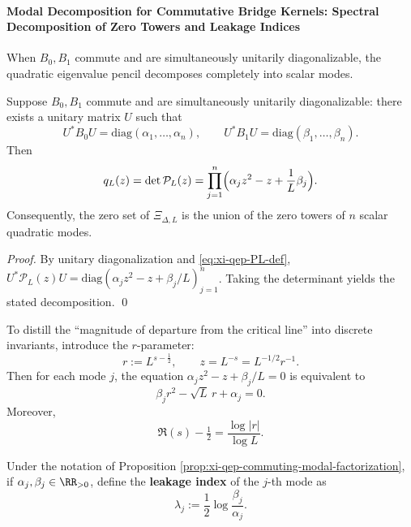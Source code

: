 \paragraph{Modal Decomposition for Commutative Bridge Kernels: Spectral Decomposition of Zero Towers and Leakage Indices}
When \(B_0,B_1\) commute and are simultaneously unitarily diagonalizable, the quadratic eigenvalue pencil decomposes completely into scalar modes.

\begin{proposition}\label{prop:xi-qep-commuting-modal-factorization}
Suppose \(B_0,B_1\) commute and are simultaneously unitarily diagonalizable: there exists a unitary matrix \(U\) such that
\[
U^\ast B_0U=\mathrm{diag}(\alpha_1,\dots,\alpha_n),
\qquad
U^\ast B_1U=\mathrm{diag}(\beta_1,\dots,\beta_n).
\]
Then
\[
q_L(z)=\det \mathcal{P}_L(z)=\prod_{j=1}^n\Bigl(\alpha_j z^2-z+\frac1L\beta_j\Bigr).
\]
Consequently, the zero set of \(\Xi_{\Delta,L}\) is the union of the zero towers of \(n\) scalar quadratic modes.
\end{proposition}

\begin{proof}
By unitary diagonalization and \eqref{eq:xi-qep-PL-def},
\(
U^\ast \mathcal{P}_L(z)U=\mathrm{diag}(\alpha_j z^2-z+\beta_j/L)_{j=1}^n
\).
Taking the determinant yields the stated decomposition. \qed
\end{proof}

To distill the ``magnitude of departure from the critical line'' into discrete invariants, introduce the \(r\)-parameter:
\begin{equation}\label{eq:xi-qep-r-def}
r:=L^{s-\tfrac12},
\qquad
z=L^{-s}=L^{-1/2}r^{-1}.
\end{equation}
Then for each mode \(j\), the equation \(\alpha_j z^2-z+\beta_j/L=0\) is equivalent to
\begin{equation}\label{eq:xi-qep-mode-r-quadratic}
\beta_j r^2-\sqrt L\,r+\alpha_j=0.
\end{equation}
Moreover,
\begin{equation}\label{eq:xi-qep-re-shift-by-r}
\Re(s)-\tfrac12=\frac{\log|r|}{\log L}.
\end{equation}

\begin{definition}\label{def:xi-modal-leakage-index}
Under the notation of Proposition \ref{prop:xi-qep-commuting-modal-factorization}, if \(\alpha_j,\beta_j\in\RR_{>0}\), define the \textbf{leakage index} of the \(j\)-th mode as
\[
\lambda_j:=\frac12\log\frac{\beta_j}{\alpha_j}.
\]
\end{definition}

